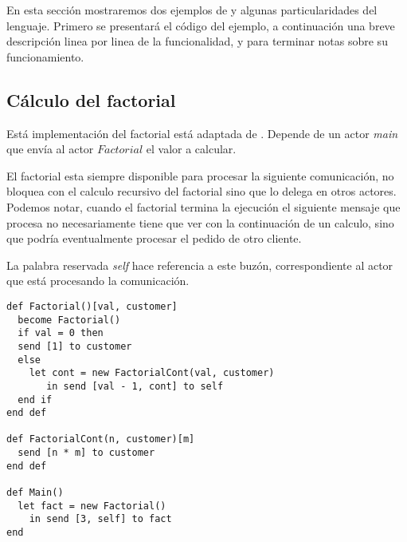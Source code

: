 En esta sección mostraremos dos ejemplos de \SAL y algunas particularidades del lenguaje. Primero se presentará el código del ejemplo, a continuación una breve descripción linea por linea de la funcionalidad,  y para terminar notas sobre su funcionamiento.

\subsection{Cálculo del factorial}

Está implementación del factorial está adaptada de \cite{Agha:1986:AMC:7929}. Depende de un actor \textit{main} que envía al actor $Factorial$ el valor a calcular. 

El factorial esta siempre disponible para procesar la siguiente comunicación, no bloquea con el calculo recursivo del factorial sino que lo delega en otros actores. Podemos notar, cuando el factorial termina la ejecución el siguiente mensaje que procesa no necesariamente tiene que ver con la continuación de un calculo, sino que podría eventualmente procesar el pedido de otro cliente.

La palabra reservada \textit{self} hace referencia a este buzón, correspondiente al actor que está procesando la comunicación.

\begin{lstlisting}[language=sal, style=simple]
def Factorial()[val, customer]
  become Factorial() 
  if val = 0 then
  send [1] to customer
  else
    let cont = new FactorialCont(val, customer)
       in send [val - 1, cont] to self
  end if 
end def

def FactorialCont(n, customer)[m] 
  send [n * m] to customer
end def

def Main() 
  let fact = new Factorial() 
    in send [3, self] to fact
end
\end{lstlisting}

